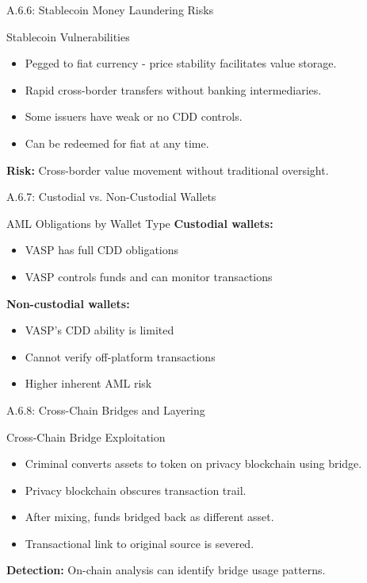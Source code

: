 \documentclass{beamer}
\begin{document}
	\begin{frame}{A.6.6: Stablecoin Money Laundering Risks}
		\begin{block}{Stablecoin Vulnerabilities}
			\begin{itemize}
				\item Pegged to fiat currency - price stability facilitates value storage.
				\item Rapid cross-border transfers without banking intermediaries.
				\item Some issuers have weak or no CDD controls.
				\item Can be redeemed for fiat at any time.
			\end{itemize}
		\end{block}
		\textbf{Risk:} Cross-border value movement without traditional oversight.
	\end{frame}
	
	\begin{frame}{A.6.7: Custodial vs. Non-Custodial Wallets}
		\begin{block}{AML Obligations by Wallet Type}
			\textbf{Custodial wallets:}
			\begin{itemize}
				\item VASP has full CDD obligations
				\item VASP controls funds and can monitor transactions
			\end{itemize}
			\textbf{Non-custodial wallets:}
			\begin{itemize}
				\item VASP's CDD ability is limited
				\item Cannot verify off-platform transactions
				\item Higher inherent AML risk
			\end{itemize}
		\end{block}
	\end{frame}
	
	\begin{frame}{A.6.8: Cross-Chain Bridges and Layering}
		\begin{block}{Cross-Chain Bridge Exploitation}
			\begin{itemize}
				\item Criminal converts assets to token on privacy blockchain using bridge.
				\item Privacy blockchain obscures transaction trail.
				\item After mixing, funds bridged back as different asset.
				\item Transactional link to original source is severed.
			\end{itemize}
		\end{block}
		\textbf{Detection:} On-chain analysis can identify bridge usage patterns.
	\end{frame}
	
\end{document}
